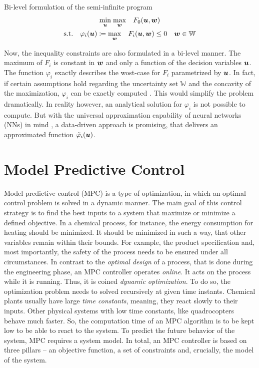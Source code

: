 \begin{definition} Bi-level formulation of the semi-infinite program
    \label{theroy:def: bi-level program}
    \[
    \begin{gathered}
        \underset{{\bm{u}}}{\min} \; \underset{{\bm{w}}}{\max} \quad F_0({\bm{u}}, {\bm{w}}) \\
        \text{s.t.} \quad \varphi_i({\bm{u}}) \coloneq \underset{{\bm{w}}}{\max} \quad F_i({\bm{u}}, {\bm{w}}) \leq 0
        \quad {\bm{w}} \in \mathbb{W}
    \end{gathered}
    \]
\end{definition}

Now, the inequality constraints are also formulated in a bi-level manner. The maximum of $F_i$ is 
constant in ${\bm{w}}$ and only a function of the decision variables ${\bm{u}}$. The function $\varphi_i$
exactly describes the wost-case for $F_i$ parametrized by ${\bm{u}}$. In fact, if certain assumptions hold
regarding the uncertainty set $\mathbb{W}$ and the concavity of the maximization,
$\varphi_i$ can be exactly computed \cite{empty000}. This would simplify the problem dramatically.
In reality however, an analytical solution for $\varphi_i$ is not possible to compute.
But with the universal approximation capability of neural networks (NNs) in mind \cite{hornik1990}, 
a data-driven approach is promising, that delivers an approximated function $\tilde{\varphi}_i({\bm{u}})$.


\section{Model Predictive Control}

Model predictive control (MPC) is a type of optimization, in which an optimal control problem is solved
in a dynamic manner. The main goal of this control strategy is to find the best inputs to a system that
maximize or minimize a defined objective. In a chemical process, for instance, the energy consumption
for heating should be minimized. It should be minimized in such a way, that other variables remain 
within their bounds. For example, the product specification and, most importantly, the safety of the process
needs to be ensured under all circumstances. In contrast to the \emph{optimal design} of a process, that 
is done during the engineering phase, an MPC controller operates \emph{online}. It acts on the process
while it is running. Thus, it is coined \emph{dynamic optimization}. To do so, the optimization
problem needs to solved recursively at given time instants.
Chemical plants usually have
large \emph{time constants}, meaning, they react slowly to their inputs.
Other physical systems with low time constants, like quadrocopters behave much faster. So, the
computation time of an MPC algorithm is to be kept low \cite{salzmann2023} to be able to react to the system.
To predict the future behavior of the system, MPC requires a system model.
\newline
\newline
In total, an MPC controller is based on three pillars – an objective function, a set of constraints and, crucially,
the model of the system.

